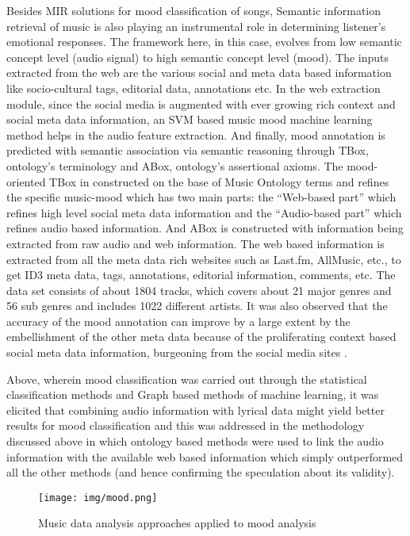 \documentclass{proc}
\begin{document}
Besides MIR solutions for mood classification of songs, Semantic information retrieval of music is also playing an instrumental role in determining listener’s emotional responses. The framework here, in this case, evolves from low semantic concept level (audio signal) to high semantic concept level (mood).  The inputs extracted from the web are the various social and meta data based information like socio-cultural tags, editorial data, annotations etc. In the web extraction module, since the social media is augmented with ever growing rich context and social meta data information, an SVM based music mood machine learning method helps in the audio feature extraction. And finally, mood annotation is predicted with semantic association via semantic reasoning through TBox, ontology’s terminology and ABox, ontology’s assertional axioms.  The mood-oriented TBox in constructed on the base of Music Ontology terms and refines the specific music-mood which has two main parts: the “Web-based part” which refines high level social meta data information and the “Audio-based part” which refines audio based information. And ABox is constructed with information being extracted from raw audio and web information. The web based information is extracted from all the meta data rich websites such as Last.fm, AllMusic, etc., to get ID3 meta data, tags, annotations, editorial information, comments, etc. The data set consists of about 1804 tracks, which covers about 21 major genres and 56 sub genres and includes 1022 different artists. It was also observed that the accuracy of the mood annotation can improve by a large extent by the embellishment of the other meta data because of the proliferating context based social meta data information, burgeoning from the social media sites \cite{Wang2010}.

Above, wherein mood classification was carried out through the statistical classification methods and Graph based methods of machine learning, it was elicited that combining audio information with lyrical data might yield better results for mood classification and this was addressed in the methodology discussed above in which ontology based methods were used to link the audio information with the available web based information which simply outperformed all the other methods (and hence confirming the speculation about its validity).  
\begin{figure}
	\centering
		\texttt{[image: img/mood.png]}
	\caption{Music data analysis approaches applied to mood analysis}
	\label{fig:mood}
\end{figure}
\end{document}
